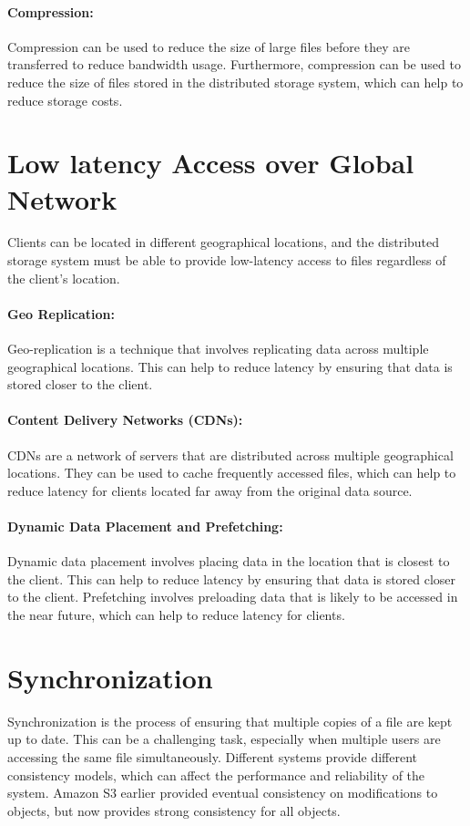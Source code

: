 \paragraph{Compression:} Compression can be used to reduce the size of large files before they are transferred to reduce bandwidth usage. Furthermore, compression can be used to reduce the size of files stored in the distributed storage system, which can help to reduce storage costs.


\section{Low latency Access over Global Network}
Clients can be located in different geographical locations, and the distributed storage system must be able to provide low-latency access to files regardless of the client's location.

\paragraph{Geo Replication:} Geo-replication is a technique that involves replicating data across multiple geographical locations. This can help to reduce latency by ensuring that data is stored closer to the client.

\paragraph{Content Delivery Networks (CDNs):} CDNs are a network of servers that are distributed across multiple geographical locations. They can be used to cache frequently accessed files, which can help to reduce latency for clients located far away from the original data source.

\paragraph{Dynamic Data Placement and Prefetching:} Dynamic data placement involves placing data in the location that is closest to the client. This can help to reduce latency by ensuring that data is stored closer to the client. Prefetching involves preloading data that is likely to be accessed in the near future, which can help to reduce latency for clients.

\section{Synchronization}
Synchronization is the process of ensuring that multiple copies of a file are kept up to date. This can be a challenging task, especially when multiple users are accessing the same file simultaneously. Different systems provide different consistency models, which can affect the performance and reliability of the system. Amazon S3 earlier provided eventual consistency on modifications to objects, but now provides strong consistency for all objects. 

